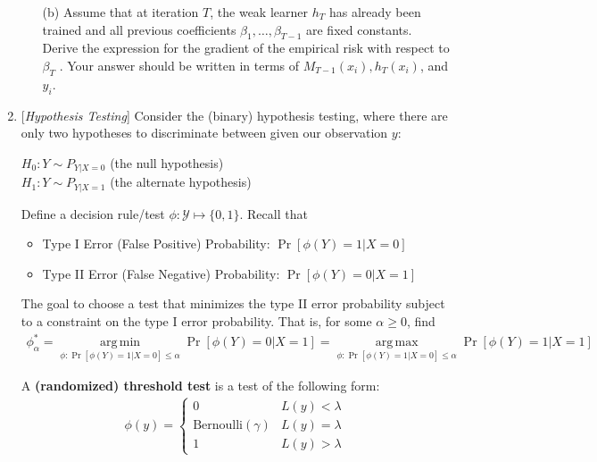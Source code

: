 \documentclass[10pt]{article}
\begin{document}
\begin{enumerate}
\begin{itemize}
	\item[(b)] Assume that at iteration $T$, the weak learner $h_T$ has already been trained and all previous coefficients $\beta_1, \dots, \beta_{T-1}$ are fixed constants. Derive the expression for the gradient of the empirical risk with respect to $\beta_T$ . Your answer should be written in terms of $M_{T-1}(x_i), h_T(x_i)$, and $y_i$.  

\end{itemize}




\newpage
\item{} {[}\textit{Hypothesis Testing}{]}
Consider the (binary) hypothesis testing, where there are only two hypotheses to discriminate between given our observation \(y\):
\begin{center}
     \(H_0: Y\sim P_{Y|X=0}\) (the null hypothesis)\\
     \(H_1: Y\sim P_{Y|X=1}\) (the alternate hypothesis)
\end{center}
Define a decision rule/test \( \phi : \mathcal Y\mapsto  \{0,1\}\). Recall that
\begin{itemize}
    \item Type I Error (False Positive) Probability: \(\Pr[\phi(Y)=1|X = 0]\)
    \item Type II Error (False Negative) Probability: \(\Pr[\phi(Y)=0|X = 1]\)
\end{itemize}
The goal to choose a test that minimizes the type II error probability subject to a constraint on the type I error probability. That is, for some \(\alpha \geq 0\), find
\begin{align}\label{power}
    \phi^*_\alpha = \operatorname*{arg\,min}_{\phi:\Pr[\phi(Y)=1|X = 0]\leq \alpha}\Pr[\phi(Y)=0|X=1] = \operatorname*{arg\,max}_{\phi:\Pr[\phi(Y)=1|X = 0]\leq \alpha}\Pr[\phi(Y)=1|X = 1]
\end{align}
\begin{definition}
    A \textbf{(randomized) threshold test} is a test of the following form:
    \begin{align*}
        \phi(y) = 
        \begin{cases}
            0 & L(y)<\lambda\\
            \text{Bernoulli}(\gamma) & L(y)=\lambda\\
            1 & L(y)>\lambda
        \end{cases}

\end{align*}
\end{definition}
\end{enumerate}
\end{document}
